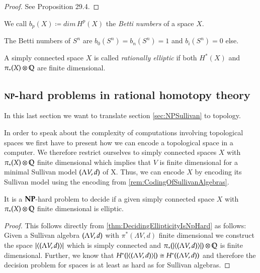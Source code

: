 \begin{proof}
 See \cite{Felix2001} Proposition 29.4. %
\end{proof}

\begin{Definition}
 We call $b_p (X) \coloneqq dim \, H^p(X)$ the \emph{Betti numbers} of a space $X$.
\end{Definition}

\begin{Example}
 The Betti numbers of $S^n$ are $b_0(S^n) = b_n(S^n) = 1$ and $ b_i(S^n) = 0$ else.
\end{Example}

\begin{Definition}
 A simply connected space $X$ is called \emph{rationally elliptic} if both $H^*(X)$ and $\pi_*(X) \otimes \mathbb{Q}$ are finite dimensional.
\end{Definition}


\subsection{$\mathbf{NP}$-hard problems in rational homotopy theory}

In this last section we want to translate section \ref{sec:NPSullivan} to topology.

\begin{Remark}
 In order to speak about the complexity of computations involving topological spaces we first have to
 present how we can encode a topological space in a computer. We therefore restrict ourselves to simply connected
 spaces $X$ with $\pi_*(X) \otimes \mathbb{Q}$ finite dimensional which implies that $V$ is finite dimensional for a minimal Sullivan model 
 $(\Lambda V,d)$ of X. Thus, we can encode $X$ by encoding its Sullivan model using the encoding from 
 \ref{rem:CodingOfSullivanAlgebras}. 
\end{Remark}

\begin{Theorem}
 \label{thm:SpacesDecidingEllipticity}
 It is a $\mathbf{NP}$-hard problem to decide if a given simply connected space $X$ with  $\pi_*(X) \otimes \mathbb{Q}$
 finite dimensional is elliptic.
\end{Theorem}

\begin{proof}
 This follows directly from \ref{thm:DecidingEllipticityIsNpHard} as follows:
 Given a Sullivan algebra $(\Lambda V,d)$ with $\pi^*(\Lambda V,d)$ finite dimensional we construct the 
 space $| \langle (\Lambda V,d) \rangle |$ which is simply connected and 
 $\pi_*(| \langle (\Lambda V,d) \rangle |) \otimes \mathbb{Q}$ is finite dimensional. Further, we know that 
 $H^*(| \langle (\Lambda V,d) \rangle |) \cong H^*( (\Lambda V,d))$ and therefore the decision problem for 
 spaces is at least as hard as for Sullivan algebras.
\end{proof}

